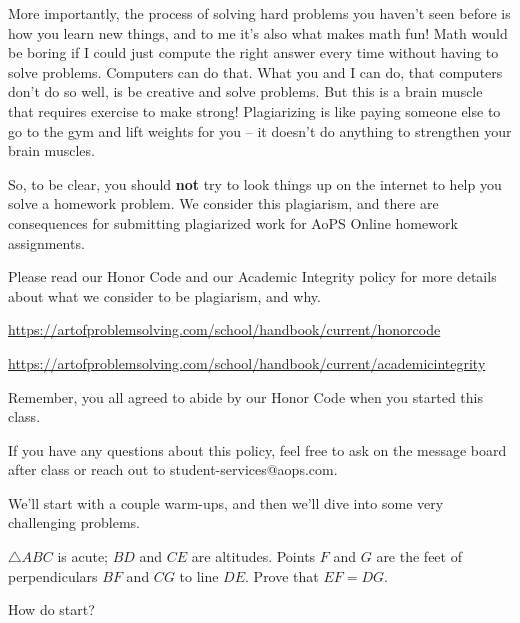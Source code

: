 More importantly, the process of solving hard problems you haven't seen before is how you learn new things, and to me it's also what makes math fun! Math would be boring if I could just compute the right answer every time without having to solve problems. Computers can do that. What you and I can do, that computers don't do so well, is be creative and solve problems. But this is a brain muscle that requires exercise to make strong! Plagiarizing is like paying someone else to go to the gym and lift weights for you -- it doesn't do anything to strengthen your brain muscles.

So, to be clear, you should \textbf{not} try to look things up on the internet to help you solve a homework problem. We consider this plagiarism, and there are consequences for submitting plagiarized work for AoPS Online homework assignments.

Please read our Honor Code and our Academic Integrity policy for more details about what we consider to be plagiarism, and why.


\url{https://artofproblemsolving.com/school/handbook/current/honorcode}

\url{https://artofproblemsolving.com/school/handbook/current/academicintegrity}


Remember, you all agreed to abide by our Honor Code when you started this class.

If you have any questions about this policy, feel free to ask on the message board after class or reach out to student-services@aops.com.

We'll start with a couple warm-ups, and then we'll dive into some very challenging problems.

$\triangle ABC$ is acute; $BD$ and $CE$ are altitudes. Points $F$ and $G$ are the feet of perpendiculars $BF$ and $CG$ to line $DE$. Prove that $EF = DG$.

How do start?



